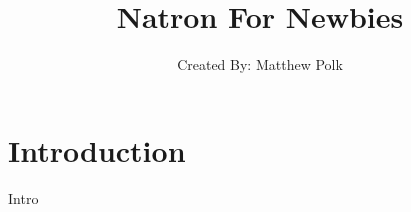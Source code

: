 \documentclass[12pt, oneside, openany, showtrims, letterpaper]{memoir}
\title{Natron For Newbies}
\author{Created By: Matthew Polk}
\date{}
\begin{document}
\maketitle

\newpage
\tableofcontents*
\pagestyle{empty}


\cleardoublepage


\chapter{Introduction}

Intro
\end{document}
